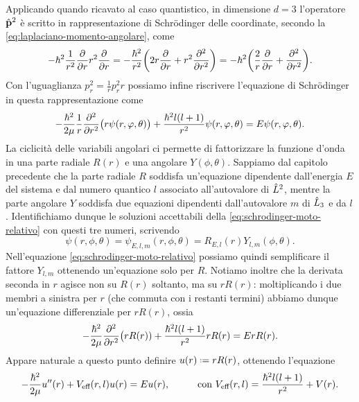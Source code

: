 Applicando quando ricavato al caso quantistico, in dimensione $d=3$ l'operatore $\hat{\mathbf{p}}^2$ è scritto in rappresentazione di Schr\"odinger delle coordinate, secondo la \eqref{eq:laplaciano-momento-angolare}, come
\begin{equation}
	-\hbar^2\frac1{r^2}\frac{\partial {}}{\partial {r}}r^2\frac{\partial {}}{\partial {r}}=-\frac{\hbar^2}{r^2}\bigg(2r\frac{\partial {}}{\partial {r}}+r^2\frac{\partial^2 {}}{\partial {r}^2}\bigg)=-\hbar^2\bigg(\frac2{r}\frac{\partial {}}{\partial {r}}+\frac{\partial^2 {}}{\partial {r}^2}\bigg).
\end{equation}
Con l'uguaglianza $p_r^2=\frac1{r}p_r^2r$ possiamo infine riscrivere l'equazione di Schr\"odinger in questa rappresentazione come
\begin{equation}
	-\frac{\hbar^2}{2\mu}\frac1{r}\frac{\partial^2 {}}{\partial {r}^2}\big(r\psi(r,\varphi,\theta)\big)+\frac{\hbar^2l(l+1)}{r^2}\psi(r,\varphi,\theta)=E\psi(r,\varphi,\theta).
	\label{eq:schrodinger-moto-relativo}
\end{equation}
La ciclicità delle variabili angolari ci permette di fattorizzare la funzione d'onda in una parte radiale $R(r)$ e una angolare $Y(\phi,\theta)$.
Sappiamo dal capitolo precedente che la parte radiale $R$ soddisfa un'equazione dipendente dall'energia $E$ del sistema e dal numero quantico $l$ associato all'autovalore di $\hat{L}^2$, mentre la parte angolare $Y$ soddisfa due equazioni dipendenti dall'autovalore $m$ di $\hat{L}_3$ e da $l$.
Identifichiamo dunque le soluzioni accettabili della \eqref{eq:schrodinger-moto-relativo} con questi tre numeri, scrivendo
\begin{equation}
	\psi(r,\phi,\theta)=\psi_{E,l,m}(r,\phi,\theta)=R_{E,l}(r)Y_{l,m}(\phi,\theta).
	\label{eq:fattorizzazione-wf-radiale-angolare}
\end{equation}
Nell'equazione \eqref{eq:schrodinger-moto-relativo} possiamo quindi semplificare il fattore $Y_{l,m}$ ottenendo un'equazione solo per $R$.
Notiamo inoltre che la derivata seconda in $r$ agisce non su $R(r)$ soltanto, ma su $rR(r)$: moltiplicando i due membri a sinistra per $r$ (che commuta con i restanti termini) abbiamo dunque un'equazione differenziale per $rR(r)$, ossia
\begin{equation}
	-\frac{\hbar^2}{2\mu}\frac{\partial^2 {}}{\partial {r}^2}\big(rR(r))+\frac{\hbar^2l(l+1)}{r^2}rR(r)=ErR(r).
\end{equation}
Appare naturale a questo punto definire $u(r)\defeq rR(r)$, ottenendo l'equazione
\begin{equation}
	-\frac{\hbar^2}{2\mu}u''(r)+V_\textup{eff}(r,l)u(r)=Eu(r),\hspace{1cm}\text{con }V_\textup{eff}(r,l)=\frac{\hbar^2l(l+1)}{r^2}+V(r).
\end{equation}
